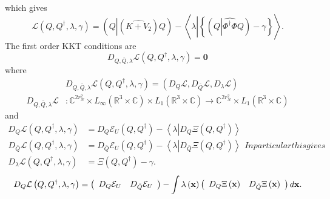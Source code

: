 \documentclass[aps,preprint]{revtex4}%
\begin{document}
which gives
\begin{equation}
\mathcal{L}\left(  Q,Q^{\dagger},\lambda,\gamma\right)  =\left(  Q\left\vert
\left(  \widehat{K+V_{2}}\right)  Q\right.  \right)  -\left\langle
\lambda\left\vert \left\{  \left(  Q\left\vert \widehat{\Phi^{\dagger}\Phi
}Q\right.  \right)  -\gamma\right\}  \right.  \right\rangle .
\end{equation}
The first order KKT conditions \cite{KKT} are%
\begin{equation}
D_{Q,\bar{Q},\lambda}\mathcal{L}\left(  Q,Q^{\dagger},\lambda,\gamma\right)
=\mathbf{0}%
\end{equation}
where
\begin{align}
&  D_{Q,\bar{Q},\lambda}\mathcal{L}\left(  Q,Q^{\dagger},\lambda
,\gamma\right)  =\left(  D_{Q}\mathcal{L},D_{\bar{Q}}\mathcal{L},D_{\lambda
}\mathcal{L}\right)  \nonumber\\
D_{Q,\bar{Q},\lambda}\mathcal{L} &  :\mathbb{C}^{2r_{N}^{2}}\times L_{\infty
}\left(  \mathbb{R}^{3}\times\mathbb{C}\right)  \times L_{1}\left(
\mathbb{R}^{3}\times\mathbb{C}\right)  \rightarrow\mathbb{C}^{2r_{N}^{2}%
}\times L_{1}\left(  \mathbb{R}^{3}\times\mathbb{C}\right)
\end{align}
and%
\begin{subequations}
\begin{align}
D_{Q}\mathcal{L}\left(  Q,Q^{\dagger},\lambda,\gamma\right)   &
=D_{Q}\mathcal{E}_{U}\left(  Q,Q^{\dagger}\right)  -\left\langle
\lambda\left\vert D_{Q}\Xi\left(  Q,Q^{\dagger}\right)  \right.  \right\rangle
\\
D_{\bar{Q}}\mathcal{L}\left(  Q,Q^{\dagger},\lambda,\gamma\right)   &
=D_{\bar{Q}}\mathcal{E}_{U}\left(  Q,Q^{\dagger}\right)  -\left\langle
\lambda\left\vert D_{\bar{Q}}\Xi\left(  Q,Q^{\dagger}\right)  \right.
\right\rangle \\
D_{\lambda}\mathcal{L}\left(  Q,Q^{\dagger},\lambda,\gamma\right)   &
=\Xi\left(  Q,Q^{\dagger}\right)  -\gamma.
\end{align}
In particular this gives
\end{subequations}
\begin{equation}
D_{Q}\mathcal{L}\left(  Q,Q^{\dagger},\lambda,\gamma\right)  =\left(
\begin{array}
[c]{cc}%
D_{Q}\mathcal{E}_{U} & D_{\bar{Q}}\mathcal{E}_{U}%
\end{array}
\right)  -\int\lambda\left(  \mathbf{x}\right)  \left(
\begin{array}
[c]{cc}%
D_{Q}\Xi\left(  \mathbf{x}\right)   & D_{\bar{Q}}\Xi\left(  \mathbf{x}\right)
\end{array}
\right)  d\mathbf{x.}%
\end{equation}
\end{document}
